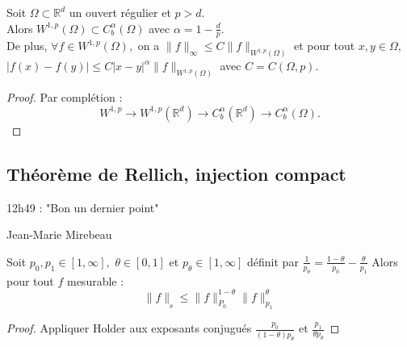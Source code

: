 \begin{corollaire}
    Soit $\Omega\subset \mathbb{R} ^d$ un ouvert régulier et $p>d.$\\
    Alors $W^{1,p}(\Omega)\subset C^\alpha _b(\Omega)$ avec $\alpha =1-\frac{d}{p}.$ \\
    De plus, $\forall f\in W^{1,p}(\Omega),$ on a $\|f\|_\infty \le C\|f\|_{W^{1,p}(\Omega)}$ et pour tout $x,y\in \Omega,$ $|f(x)-f(y)| \le C|x-y| ^\alpha \|f\|_{W^{1,p}(\Omega)}$ avec $C=C(\Omega,p).$
\end{corollaire}
\begin{proof}
    Par complétion :
    $$W^{1,p}\longrightarrow W^{1,p}(\mathbb{R} ^d)\longrightarrow C^\alpha _b(\mathbb{R} ^d)\longrightarrow C^\alpha _b(\Omega).$$
\end{proof}


\subsection{Théorème de Rellich, injection compact}
\epigraph{12h49 : "Bon un dernier point"}{Jean-Marie Mirebeau}
\begin{lemme}
    Soit $p_0,p_1\in [1,\infty ],$ $\theta\in [0,1]$ et $p_\theta\in [1,\infty ]$ définit par $\frac{1}{p_\theta}=\frac{1-\theta}{p_0}-\frac{\theta}{p_1}$ Alors pour tout $f$ mesurable :
    $$\|f\|_{_\theta}\le \|f\|_{P_0}^{1-\theta}\|f\|_{p_1}^\theta$$
\end{lemme}
\begin{proof}
    Appliquer Holder aux exposants conjugués $\frac{p_0}{(1-\theta)p_\theta}$ et $\frac{p_1}{\theta p_\theta}$
\end{proof}


